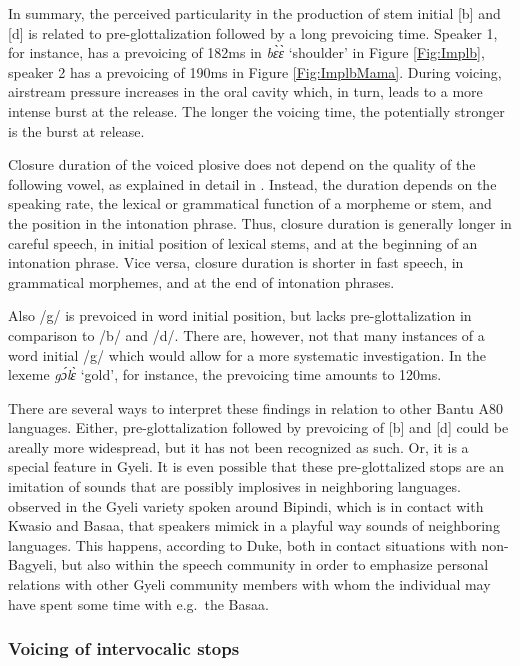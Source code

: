 In summary, the perceived particularity in the production of stem initial [b] and [d] is related to pre-glottalization followed by a long prevoicing time. Speaker 1, for instance, has a prevoicing of 182ms in {\itshape bɛ̀ɛ̀} `shoulder' in Figure \ref{Fig:Implb}, speaker 2 has a prevoicing of 190ms in Figure \ref{Fig:ImplbMama}. During voicing, airstream pressure increases in the oral cavity which, in turn, leads to a more intense burst at the release.  The longer the voicing time, the potentially stronger is the burst at release. 

Closure duration of the voiced plosive does not depend on the quality of the following vowel, as explained in detail in \citet{grimm2019}. Instead, the duration depends on the speaking rate, the lexical or grammatical function of a morpheme or stem, and the position in the intonation phrase. Thus, closure duration is generally longer in careful speech, in initial position of lexical stems, and at the beginning of an intonation phrase. Vice versa, closure duration is shorter  in fast speech, in grammatical morphemes, and at the end of intonation phrases.


Also /g/ is prevoiced in word initial position, but lacks pre-glottalization in comparison to /b/ and /d/.  There are, however, not that many instances of a word initial /g/ which would allow for a more systematic investigation. In the lexeme {\itshape gɔ́lɛ̀} `gold', for instance, the prevoicing time amounts to 120ms. 

There are several ways to interpret these findings in relation to other Bantu A80 languages. Either, pre-glottalization followed by prevoicing of [b] and [d] could be areally more widespread, but it has not been recognized as such. Or, it is a special feature in Gyeli. It is even possible that these pre-glottalized stops are an imitation of sounds that are possibly implosives in neighboring languages. \citet{duke2014} observed in the Gyeli variety spoken around Bipindi, which is in contact with Kwasio and Basaa, that speakers mimick in a playful way sounds of neighboring languages. This happens, according to Duke, both in contact situations with non-Bagyeli, but also within the speech community in order to emphasize personal relations with other Gyeli community members with whom the individual may have spent some time with e.g.\ the Basaa. 







\subsubsection{Voicing of intervocalic stops}
\label{sec:Post-N}








